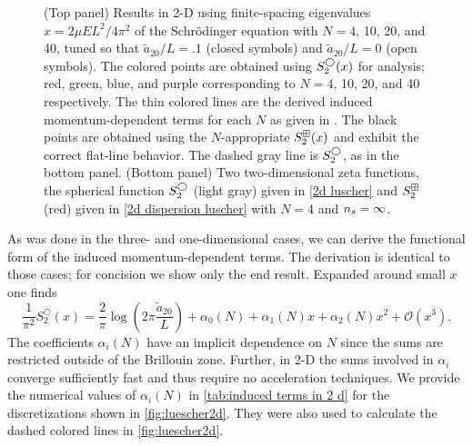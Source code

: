 \begin{figure}
    \center
    
    \caption{
        (Top panel)
        Results in 2-D using finite-spacing eigenvalues $x=2\mu EL^2/4\pi^2$ of the Schr\"odinger equation with $N=4$, 10, 20, and 40, tuned so that $\tilde a_{20}/L=.1$ (closed symbols) and $\tilde a_{20}/L=0$ (open symbols).
        The colored points are obtained using $S^\bigcirc_2(x)$ for analysis; red, green, blue, and purple corresponding to $N=4$, 10, 20, and 40 respectively.
        The thin colored lines are the derived induced momentum-dependent terms for each $N$ as given in .
        The black points are obtained using the $N$-appropriate $S^{\boxplus}_2(x)$ and exhibit the correct flat-line behavior.
        The dashed gray line is $S_2^\bigcirc$, as in the bottom panel.
        (Bottom panel)
        Two two-dimensional zeta functions, the spherical function $S_2^{\bigcirc}$ (light gray) given in \eqref{2d luscher} and $S_2^{\boxplus}$ (red) given in \eqref{2d dispersion luscher} with $N=4$ and ${n_s}=\infty$.
        }
    \label{fig:luescher2d}
\end{figure}

As was done in the three- and one-dimensional cases, we can derive the functional form of the induced momentum-dependent terms.
The derivation is identical to those cases; for concision we show only the end result.
Expanded around small $x$ one finds
\begin{equation}
    \label{eq:2D corrections}
    \frac{1}{ \pi^{2}} S^\bigcirc_{2}\left(x\right)
    =
    \frac{2}{\pi}\log\left(2\pi \frac{\tilde a_{20}}{L}\right)
    + \alpha_0(N)
    + \alpha_1(N) x
    + \alpha_2(N) x^2
    + \mathcal{O}(x^3).
\end{equation}
The coefficients $\alpha_i(N)$ have an implicit dependence on $N$ since the sums are restricted outside of the Brillouin zone.  Further, in 2-D the sums involved in $\alpha_i$ converge sufficiently fast and thus require no acceleration techniques.  We provide the numerical values of $\alpha_i(N)$ in \autoref{tab:induced terms in 2 d} for the discretizations shown in \autoref{fig:luescher2d}.  They were also used to calculate the dashed colored lines in \autoref{fig:luescher2d}.

